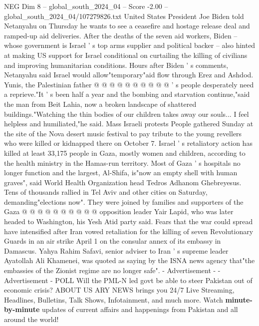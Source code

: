 \begin{textsample}{NEG Dim 8 – global\_south\_2024\_04 – Score -2.00 – global\_south\_2024\_04/107279826.txt}
United States President Joe Biden told Netanyahu on Thursday he wants to see a ceasefire and hostage release deal and ramped-up aid deliveries.
After the deaths of the seven aid workers, Biden -- whose government is Israel ' s top arms supplier and political backer -- also hinted at making US support for Israel conditional on curtailing the killing of civilians and improving humanitarian conditions.
Hours after Biden ' s comments, Netanyahu said Israel would allow"temporary"aid flow through Erez and Ashdod.
Yunis, the Palestinian father @ @ @ @ @ @ @ @ @ @ ' s people desperately need a reprieve."It ' s been half a year and the bombing and starvation continue,"said the man from Beit Lahia, now a broken landscape of shattered buildings."Watching the thin bodies of our children takes away our souls...
I feel helpless and humiliated,"he said.
Mass Israeli protests People gathered Sunday at the site of the Nova desert music festival to pay tribute to the young revellers who were killed or kidnapped there on October 7.
Israel ' s retaliatory action has killed at least 33,175 people in Gaza, mostly women and children, according to the health ministry in the Hamas-run territory.
Most of Gaza ' s hospitals no longer function and the largest, Al-Shifa, is"now an empty shell with human graves", said World Health Organization head Tedros Adhanom Ghebreyesus.
Tens of thousands rallied in Tel Aviv and other cities on Saturday, demanding"elections now".
They were joined by families and supporters of the Gaza @ @ @ @ @ @ @ @ @ @ opposition leader Yair Lapid, who was later headed to Washington, his Yesh Atid party said.
Fears that the war could spread have intensified after Iran vowed retaliation for the killing of seven Revolutionary Guards in an air strike April 1 on the consular annex of its embassy in Damascus.
Yahya Rahim Safavi, senior adviser to Iran ' s supreme leader Ayatollah Ali Khamenei, was quoted as saying by the ISNA news agency that"the embassies of the Zionist regime are no longer safe". - Advertisement - - Advertisement - POLL Will the PML-N led govt be able to steer Pakistan out of economic crisis?
ABOUT US ARY NEWS brings you 24/7 Live Streaming, Headlines, Bulletins, Talk Shows, Infotainment, and much more.
Watch \textbf{minute-by-minute} updates of current affairs and happenings from Pakistan and all around the world!

\end{textsample}
